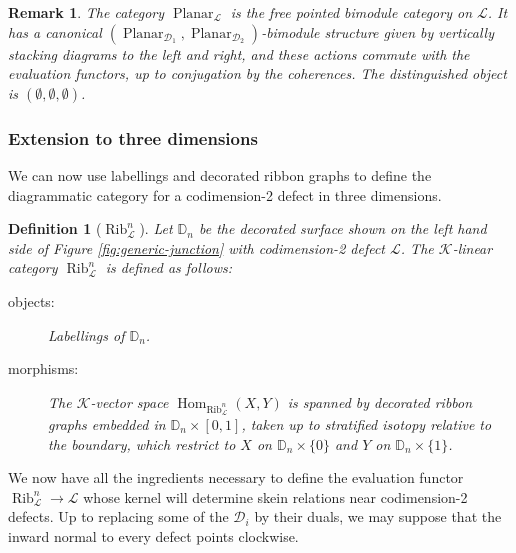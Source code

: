 \documentclass[a4paper]{article}
\numberwithin{equation}{section}
\newtheorem{definition}[counter]{Definition}
\newtheorem{remark}[counter]{Remark}
\newcommand{\1}{{\mathrm{1}\mkern-4mu{\mathchoice{}{}{\mskip-0.5mu}{\mskip-1mu}}\mathrm{l}}}
\newcommand{\DD}{\mathbb{D}}
\DeclareMathOperator{\Hom}{Hom}
\newcommand{\D}{\mathcal{D}}
\newcommand{\K}{\mathcal{K}}
\renewcommand{\L}{\mathcal{L}}
\DeclareMathOperator{\Rib}{Rib}
\DeclareMathOperator{\Planar}{Planar} %
\begin{document}
\begin{remark}
    The category $\Planar_\L$ is the free pointed bimodule category on $\L$. It has a canonical $(\Planar_{\D_1},\Planar_{\D_2})$-bimodule structure given by vertically stacking diagrams to the left and right, and these actions commute with the evaluation functors, up to conjugation by the coherences. The distinguished object is $(\emptyset,\emptyset,\emptyset)$.
\end{remark}

\subsubsection{Extension to three dimensions}\label{sec:3d-skein-relations}
We can now use labellings and decorated ribbon graphs to define the diagrammatic category for a codimension-2 defect in three dimensions.

\begin{definition}[$\Rib^n_\L$]\label{def:ribL}
  Let $\DD_n$ be the decorated surface shown on the left hand side of Figure \ref{fig:generic-junction} with codimension-2 defect $\L$. 
  The $\K$-linear category $\Rib_\L^n$ is defined as follows:\\[-2em]
  \begin{description}
    \item[objects:] Labellings of $\DD_n$.
    \item[morphisms:] The $\K$-vector space $\Hom_{\Rib_\L^n}(X,Y)$ is spanned by decorated ribbon graphs embedded in $\DD_n\times[0,1]$, taken up to stratified isotopy relative to the boundary, which restrict to $X$ on $\DD_n\times\{0\}$ and $Y$ on $\DD_n\times\{1\}$.
   
  \end{description}
\end{definition}


We now have all the ingredients necessary to define the evaluation functor $\Rib_\L^n \to \L$ whose kernel will determine skein relations near codimension-2 defects.
Up to replacing some of the $\D_i$ by their duals, we may suppose that the inward normal to every defect points clockwise.
\end{document}
